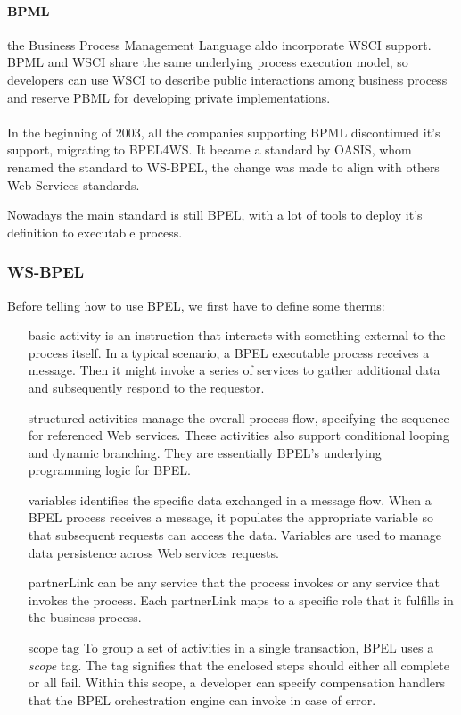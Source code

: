 \documentclass[12pt,a4paper]{article}
\begin{document}
\paragraph{BPML} 
the Business Process Management Language aldo incorporate WSCI support. BPML and WSCI share the same underlying process execution model, so developers can use WSCI to describe public interactions among business process and reserve PBML for developing private implementations.\\ \\

In the beginning of 2003, all the companies supporting BPML discontinued it's support, migrating to BPEL4WS. It became a standard by OASIS, whom renamed the standard to WS-BPEL, the change was made to align with others Web Services standards.

Nowadays the main standard is still BPEL, with a lot of tools to deploy it's definition to executable process.

\subsubsection{WS-BPEL}
Before telling how to use BPEL, we first have to define some therms:
\begin{itemize}
\item[basic activity] is an instruction that interacts with something external to the process itself. In a typical scenario, a BPEL executable process receives a message. Then it might invoke a series of services to gather additional data and subsequently respond to the requestor.

\item[structured activities] manage the overall process flow, specifying the sequence for referenced Web services. These activities also support conditional looping and dynamic branching. They are essentially BPEL’s underlying programming logic for BPEL. 

\item[variables] identifies the specific data exchanged in a message flow. When a BPEL process receives a message, it populates the appropriate variable so that subsequent requests can access the data. Variables are used to manage data persistence across Web services requests.

\item[partnerLink] can be any service that the process invokes or any service that invokes the process. Each partnerLink maps to a specific role that it fulfills in the business process.

\item[scope tag] To group a set of activities in a single transaction, BPEL uses a \emph{scope} tag. The tag signifies that the enclosed steps should either all complete or all fail. Within this scope, a developer can specify compensation handlers that the BPEL orchestration engine can invoke in case of error.
\end{itemize}
\end{document}
